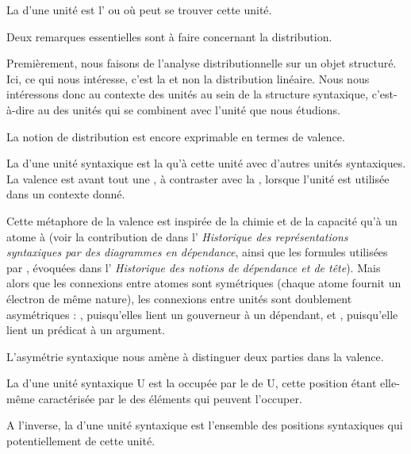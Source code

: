 {La  d’une unité est l’ ou  où peut se trouver cette unité.}

Deux remarques essentielles sont à faire concernant la distribution.

Premièrement, nous faisons de l’analyse distributionnelle sur un objet structuré. Ici, ce qui nous intéresse, c’est la  et non la distribution linéaire. Nous nous intéressons donc au contexte des unités au sein de la structure syntaxique, c’est-à-dire au  des unités qui se combinent avec l’unité que nous étudions.

La notion de distribution est encore exprimable en termes de valence.

{La  d’une unité syntaxique est la  qu’à cette unité  avec d’autres unités syntaxiques. La valence est avant tout une , à contraster avec la , lorsque l’unité est utilisée dans un contexte donné.}

Cette métaphore de la valence est inspirée de la chimie et de la capacité qu’à un atome à  (voir la contribution de \citet{Peirce1897} dans l’ \textit{Historique des représentations syntaxiques par des diagrammes en dépendance}, ainsi que les formules utilisées par \citet{jespersen1937analytic}, évoquées dans l’ \textit{Historique des notions de dépendance et de tête}). Mais alors que les connexions entre atomes sont symétriques (chaque atome fournit un électron de même nature), les connexions entre unités sont doublement asymétriques : , puisqu’elles lient un gouverneur à un dépendant, et , puisqu’elle lient un prédicat à un argument.

L’asymétrie syntaxique nous amène à distinguer deux parties dans la valence.

{La  d’une unité syntaxique U est la  occupée par le  de U, cette position étant elle-même caractérisée par le  des éléments qui peuvent l’occuper.}

{A l’inverse, la  d’une unité syntaxique est l’ensemble des positions syntaxiques qui  potentiellement de cette unité.}

